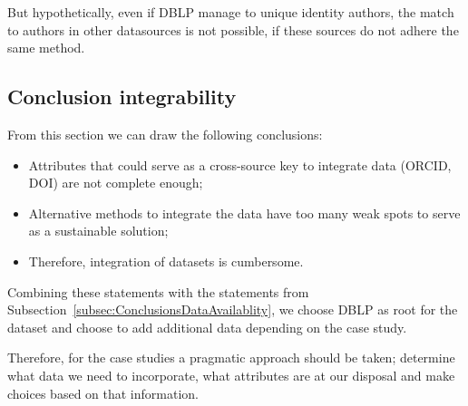 \documentclass{ou-report}
\newcommand{\doi}{{DOI}}
\newcommand{\dblp}{DBLP}
\newcommand{\orcid}{ORCID}
\begin{document}
But hypothetically, even if \dblp{} manage to unique identity authors, 
the match to authors in other datasources is not possible, if these sources 
do not adhere the same method.




\subsection{Conclusion integrability}
From this section we can draw the following conclusions:
\begin{itemize}
    \item Attributes that could serve as a cross-source key to integrate data 
    (\orcid{}, \doi{}) are not complete enough;
    \item Alternative methods to integrate the data have too many weak spots to
    serve as a sustainable solution;
    \item Therefore, integration of datasets is cumbersome.
\end{itemize}

Combining these statements with the statements from 
Subsection~\ref{subsec:ConclusionsDataAvailablity}, we choose \dblp{} as root 
for the dataset and choose to add additional data depending on the case study.




Therefore, for the case studies a pragmatic approach should be taken; determine 
what data we need to incorporate, what attributes are at our disposal and make 
choices based on that information.
\end{document}
